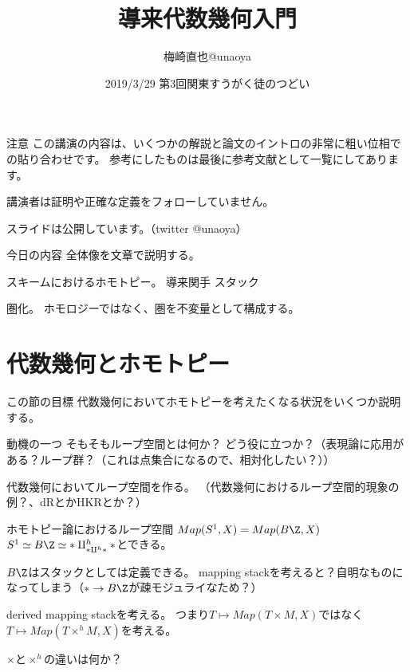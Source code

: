 \documentclass[dvipdfmx]{beamer}
\title{導来代数幾何入門}
\author{梅崎直也@unaoya}
\date{2019/3/29 第3回関東すうがく徒のつどい}
\begin{document}
\begin{frame}
\maketitle
\end{frame}

\begin{frame}
\tableofcontents
\end{frame} 

\begin{frame}{注意}
この講演の内容は、いくつかの解説と論文のイントロの非常に粗い位相での貼り合わせです。
参考にしたものは最後に参考文献として一覧にしてあります。

講演者は証明や正確な定義をフォローしていません。

スライドは公開しています。（twitter @unaoya）
\end{frame}

\begin{frame}{今日の内容}
全体像を文章で説明する。

スキームにおけるホモトピー。
導来関手
スタック

圏化。
ホモロジーではなく、圏を不変量として構成する。
\end{frame}

\section{代数幾何とホモトピー}

\begin{frame}{この節の目標}
代数幾何においてホモトピーを考えたくなる状況をいくつか説明する。
\end{frame}

\begin{frame}{動機の一つ}
そもそもループ空間とは何か？
どう役に立つか？（表現論に応用がある？ループ群？（これは点集合になるので、相対化したい？））

代数幾何においてループ空間を作る。
（代数幾何におけるループ空間的現象の例？、dRとかHKRとか？）

ホモトピー論におけるループ空間
$Map(S^1,X)=Map(B\Z,X)$
$S^1\simeq B\Z\simeq \ast\amalg^h_{\ast\amalg^h\ast}\ast$とできる。

$B\Z$はスタックとしては定義できる。
mapping stackを考えると？自明なものになってしまう（$\ast \to B\Z$が疎モジュライなため？）

derived mapping stackを考える。
つまり$T \mapsto Map(T\times M,X)$ではなく$T\mapsto Map(T\times^hM,X)$を考える。

$\times$と$\times^h$の違いは何か？
\end{frame}
\end{document}

